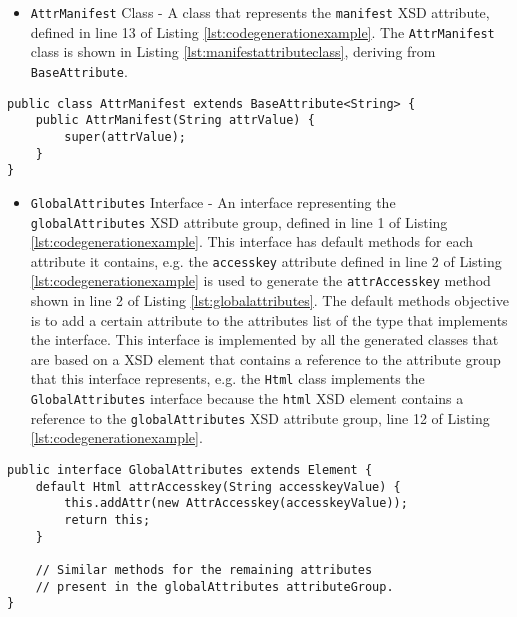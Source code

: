 \begin{itemize}
	\item \texttt{AttrManifest} Class - A class that represents the \texttt{manifest} \ac{XSD} attribute, defined in line 13 of Listing \ref{lst:codegenerationexample}. The \texttt{AttrManifest} class is shown in Listing \ref{lst:manifestattributeclass}, deriving from \texttt{BaseAttribute}.
\end{itemize}

\bigskip


\begin{minipage}{\linewidth}
\begin{lstlisting}[caption={AttrManifest Class Corresponding to the XSD Attribute Named manifest},captionpos=b,label={lst:manifestattributeclass}]
public class AttrManifest extends BaseAttribute<String> {
    public AttrManifest(String attrValue) {
        super(attrValue);
    }
}
\end{lstlisting}
\end{minipage}

\begin{itemize}
	\item \texttt{GlobalAttributes} Interface - An interface representing the \texttt{globalAttributes} \ac{XSD} attribute group, defined in line 1 of Listing \ref{lst:codegenerationexample}. This interface has default methods for each attribute it contains, e.g. the \texttt{accesskey} attribute defined in line 2 of Listing \ref{lst:codegenerationexample} is used to generate the \texttt{attrAccesskey} method shown in line 2 of Listing \ref{lst:globalattributes}. The default methods objective is to add a certain attribute to the attributes list of the type that implements the interface. This interface is implemented by all the generated classes that are based on a \ac{XSD} element that contains a reference to the attribute group that this interface represents, e.g. the \texttt{Html} class implements the \texttt{GlobalAttributes} interface because the \texttt{html} \ac{XSD} element contains a reference to the \texttt{globalAttributes} \ac{XSD} attribute group, line 12 of Listing \ref{lst:codegenerationexample}.
\end{itemize}

\bigskip


\begin{minipage}{\linewidth}
\begin{lstlisting}[caption={GlobalAttributes Interface Corresponding to the XSD Attribute Group Named globalAttributes},captionpos=b,label={lst:globalattributes}]
public interface GlobalAttributes extends Element {
    default Html attrAccesskey(String accesskeyValue) {
        this.addAttr(new AttrAccesskey(accesskeyValue));
        return this;
    }
    
    // Similar methods for the remaining attributes 
    // present in the globalAttributes attributeGroup.
}
\end{lstlisting}
\end{minipage}

